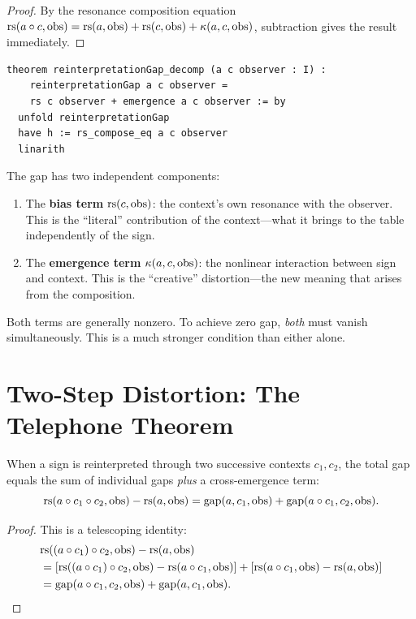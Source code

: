 \begin{proof}
By the resonance composition equation $\mathrm{rs}(a \circ c, \mathrm{obs})
= \mathrm{rs}(a, \mathrm{obs}) + \mathrm{rs}(c, \mathrm{obs}) + \kappa(a, c, \mathrm{obs})$,
subtraction gives the result immediately.
\end{proof}

\begin{lstlisting}
theorem reinterpretationGap_decomp (a c observer : I) :
    reinterpretationGap a c observer =
    rs c observer + emergence a c observer := by
  unfold reinterpretationGap
  have h := rs_compose_eq a c observer
  linarith
\end{lstlisting}

\begin{interpretation}
The gap has two independent components:
\begin{enumerate}
\item The \textbf{bias term} $\mathrm{rs}(c, \mathrm{obs})$: the context's own
  resonance with the observer.  This is the ``literal'' contribution of
  the context---what it brings to the table independently of the sign.
\item The \textbf{emergence term} $\kappa(a, c, \mathrm{obs})$: the
  nonlinear interaction between sign and context.  This is the ``creative''
  distortion---the new meaning that arises from the composition.
\end{enumerate}
Both terms are generally nonzero.  To achieve zero gap, \emph{both}
must vanish simultaneously.  This is a much stronger condition than
either alone.
\end{interpretation}

\section{Two-Step Distortion: The Telephone Theorem}

\begin{theorem}
\label{thm:two-step}
When a sign is reinterpreted through two successive contexts
$c_1, c_2$, the total gap equals the sum of individual gaps
\emph{plus} a cross-emergence term:
\[
  \mathrm{rs}(a \circ c_1 \circ c_2, \mathrm{obs}) - \mathrm{rs}(a, \mathrm{obs})
  = \mathrm{gap}(a, c_1, \mathrm{obs}) +
    \mathrm{gap}(a \circ c_1, c_2, \mathrm{obs}).
\]
\end{theorem}

\begin{proof}
This is a telescoping identity:
\begin{align*}
  &\mathrm{rs}((a \circ c_1) \circ c_2, \mathrm{obs}) - \mathrm{rs}(a, \mathrm{obs}) \\
  &= [\mathrm{rs}((a \circ c_1) \circ c_2, \mathrm{obs})
    - \mathrm{rs}(a \circ c_1, \mathrm{obs})] +
    [\mathrm{rs}(a \circ c_1, \mathrm{obs}) - \mathrm{rs}(a, \mathrm{obs})] \\
  &= \mathrm{gap}(a \circ c_1, c_2, \mathrm{obs}) +
    \mathrm{gap}(a, c_1, \mathrm{obs}).
\end{align*}
\end{proof}

